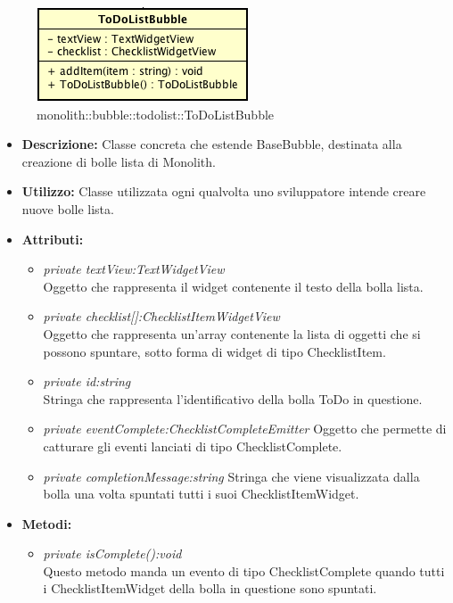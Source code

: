 \label{monolith::bubble::todolist::ToDoListBubble}
\begin{figure}[H]
	\centering
	\includegraphics[scale=0.5]{Sezioni/SottosezioniST/img/ToDoListBubble.png}
	\caption{monolith::bubble::todolist::ToDoListBubble}
\end{figure}

\begin{itemize}
\item \textbf{Descrizione:} Classe concreta che estende BaseBubble, destinata alla creazione di bolle lista di Monolith.
\item \textbf{Utilizzo:} Classe utilizzata ogni qualvolta uno sviluppatore intende creare nuove bolle lista.
\item \textbf{Attributi:}
\begin{itemize}
\item \textit{private textView:TextWidgetView}\\
Oggetto che rappresenta il widget contenente il testo della bolla lista.
\item \textit{private checklist[]:ChecklistItemWidgetView}\\
Oggetto che rappresenta un'array contenente la lista di oggetti che si possono spuntare, sotto forma di widget di tipo ChecklistItem.
\item \textit {private id:string}\\
Stringa che rappresenta l'identificativo della bolla ToDo in questione.
\item \textit {private eventComplete:ChecklistCompleteEmitter}
Oggetto che permette di catturare gli eventi lanciati di tipo ChecklistComplete.
\item \textit {private completionMessage:string}
Stringa che viene visualizzata dalla bolla una volta spuntati tutti i suoi ChecklistItemWidget.
\end{itemize}
\item \textbf{Metodi:}
\begin{itemize}
\item \textit{private isComplete():void}\\
Questo metodo manda un evento di tipo ChecklistComplete quando tutti i ChecklistItemWidget della bolla in questione sono spuntati.

\end{itemize}
\end{itemize}

